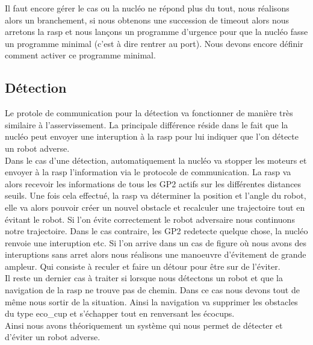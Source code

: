 \documentclass[a4paper,10pt]{report}
\begin{document}
\begin{spacing}{1.5}
\begin{multicols}{2}
\begin{center}
\end{center}
\end{multicols}
Il faut encore gérer le cas ou la nucléo ne répond plus du tout, nous réalisons
alors un branchement, si nous obtenons une succession de timeout alors nous
arretons la rasp et nous lançons un programme d'urgence pour que la nucléo
fasse un programme minimal (c'est à dire rentrer au port). Nous devons encore définir comment activer ce
programme minimal.

\subsection{Détection}
Le protole de communication pour la détection va fonctionner de manière très
similaire à l'asservissement. La principale différence réside dans le fait que
la nucléo peut envoyer une interuption à la rasp pour lui indiquer que l'on
détecte un robot adverse. \\
Dans le cas d'une détection, automatiquement la nucléo va stopper les moteurs et
envoyer à la rasp l'information via le protocole de communication. La rasp va
alors recevoir les informations de tous les GP2 actifs sur les différentes
distances seuils. Une fois cela effectué, la rasp va déterminer la position et
l'angle du robot, elle va alors pouvoir créer un nouvel obstacle et recalculer
une trajectoire tout en évitant le robot. Si l'on évite correctement le robot
adversaire nous continuons notre trajectoire. Dans le cas contraire, les GP2
redetecte quelque chose, la nucléo renvoie une interuption etc. Si l'on arrive
dans un cas de figure où nous avons des interuptions sans arret alors nous
réalisons une manoeuvre d'évitement de grande ampleur. Qui consiste à reculer et
faire un détour pour être sur de l'éviter. \\
Il reste un dernier cas à traiter si lorsque nous détectons un robot et que la
navigation de la rasp ne trouve pas de chemin. Dans ce cas nous devons tout de
même nous sortir de la situation. Ainsi la navigation va supprimer les obstacles
du type eco\_cup et s'échapper tout en renversant les écocups. \\
Ainsi nous avons théoriquement un système qui nous permet de détecter et
d'éviter un robot adverse.

\end{spacing}
\end{document}
